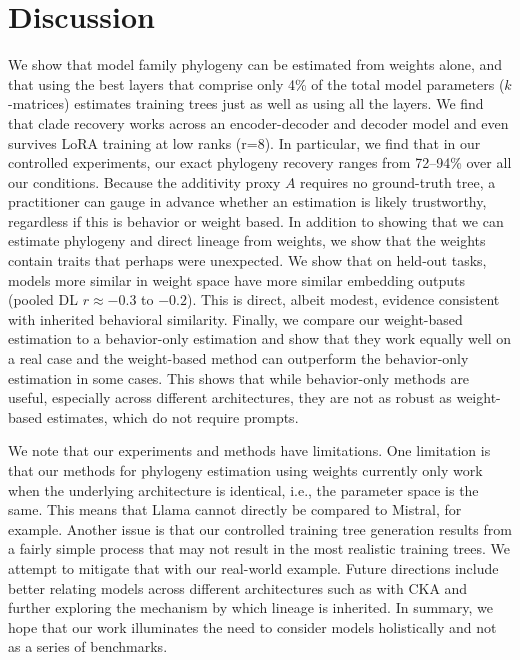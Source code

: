 \documentclass{article}
\theoremstyle{definition}
\theoremstyle{plain}
\begin{document}
\section{Discussion}
\label{sec:discussion}

We show that model family phylogeny can be estimated from weights alone, and that using the best layers that comprise only 4\% of the total model parameters ($k$-matrices) estimates training trees just as well as using all the layers.  We find that clade recovery works across an encoder-decoder and decoder model and even survives LoRA training at low ranks (r=8). In particular, we find that in our controlled experiments, our exact phylogeny recovery ranges from 72--94\% over all our conditions. Because the additivity proxy $A$ requires no ground-truth tree, a practitioner can gauge in advance whether an estimation is likely trustworthy, regardless if this is behavior or weight based. In addition to showing that we can estimate phylogeny and direct lineage from weights, we show that the weights contain traits that perhaps were unexpected.  We show that on held-out tasks, models more similar in weight space have more similar embedding outputs (pooled DL $r \approx -0.3$ to $-0.2$). This is direct, albeit modest, evidence consistent with inherited behavioral similarity.   Finally, we compare our weight-based estimation to a behavior-only estimation and show that they work equally well on a real case and the weight-based method can outperform the behavior-only estimation in some cases.  This shows that while behavior-only methods are useful, especially across different architectures, they are not as robust as weight-based estimates, which do not require prompts.


We note that our experiments and methods have limitations.  One limitation is that our methods for phylogeny estimation using weights currently only work when the underlying architecture is identical, i.e., the parameter space is the same.  This means that Llama cannot directly be compared to Mistral, for example. Another issue is that our controlled training tree generation results from a fairly simple process that may not result in the most realistic training trees.  We attempt to mitigate that with our real-world example. Future directions include better relating models across different architectures such as with CKA and further exploring the mechanism by which lineage is inherited. In summary, we hope that our work illuminates the need to consider models holistically and not as a series of benchmarks.
\end{document}
